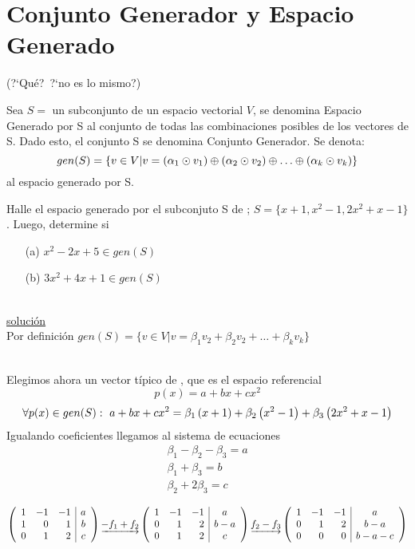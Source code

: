 \section{Conjunto Generador y Espacio Generado}(?`Qué?\ ?`no es lo mismo?)


\begin{dfn}
Sea $S=$ un subconjunto de un espacio vectorial $V$, se denomina Espacio Generado por S al conjunto de todas las combinaciones posibles de los vectores de S. Dado esto, el conjunto S se denomina Conjunto Generador. Se denota:
\[gen(S)=
\lbrace v \in V|v=\av{}{\alpha_1 \odot v_1} \oplus
\av{}{\alpha_2 \odot v_2} \oplus 
\hdots \oplus
\av{}{\alpha_k \odot v_k}
\rbrace
\]
al espacio generado por S.
\end{dfn}

\begin{ejemplo}
Halle el espacio generado por el subconjuto S de \pdos; $S=\lbrace
x+1, x^2-1, 2x^2+x-1\rbrace$. Luego, determine si 
\begin{enumerate}
\item[(a)]$x^2-2x+5 \in gen(S)$
\item[(b)]$3x^2+4x+1 \in gen(S)$
\end{enumerate}
\end{ejemplo}

~\\
\underline{solución}
~\\
Por definición $gen(S)=
\lbrace v \in V|v=
\beta_1 v_2+
\beta_2 v_2+
\ldots+
\beta_k v_k
\rbrace
$

~\\
Elegimos ahora un vector típico de \pdos, que es el espacio referencial
\[p(x)=a+b x+c x^2\]
$$\forall p(x)\in gen(S):\  
a+b x+c x^2=
\av{\beta_1}{x+1}+
\av{\beta_2}{x^2-1}+
\av{\beta_3}{2x^2+x-1}
$$
Igualando coeficientes llegamos al sistema de ecuaciones
\begin{eqnarray*}
\beta_1-\beta_2-\beta_3=a\\
\beta_1+\beta_3=b\\
\beta_2+2\beta_3=c
\end{eqnarray*}

\[
\reducir{rrr|c}{
1&-1&-1&a\\
1&0&1&b\\
0&1&2&c
}
\underrightarrow{-f_1 + f_2}
\reducir{rrr|c}{
1&-1&-1&a\\
0&1&2&b-a\\
0&1&2&c
}
\underrightarrow{f_2 - f_3}
\reducir{rrr|c}{
1&-1&-1&a\\
0&1&2&b-a\\
0&0&0&b-a-c
}
\]

